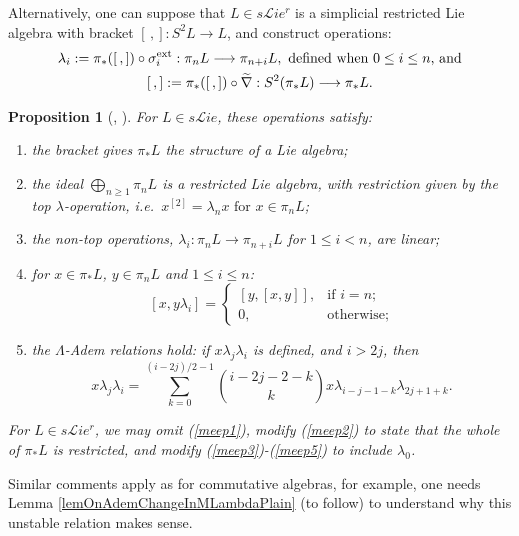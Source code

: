 \documentclass[11pt]{amsart} \renewcommand{\baselinestretch}{1.2}
\theoremstyle{plain}
\newtheorem{prop}[thm]{Proposition}
\numberwithin{equation}{section} %
\theoremstyle{plain}
\newtheorem{prop}[thm]{Proposition}
\numberwithin{equation}{chapter} %
\renewcommand{\to}{\longrightarrow}
\newcommand{\scrL}{\mathscr{L}}
\newcommand{\citeBOX}[2][]{\cite[\mbox{#1}]{#2}}
\newcommand{\restn}[1]{#1^{[2]}}
\newcommand{\liealgs}{{\scrL\!\textit{ie}}}
\newcommand{\restliealgs}{{\scrL\!\textit{ie}^\textit{r}}}
\begin{document}
\begin{Constructing homotopy operations}
Alternatively, one can suppose that $L\in s \restliealgs$ is a simplicial restricted Lie algebra with bracket $[\,,]:S^2L\to L$, and construct operations:
\begin{gather*}
\lambda_i:=\pi_*([\,,])\circ\sigma_i^\textup{ext}:\pi_nL\to \pi_{n+i}L,\textup{ defined when }0\leq i\leq n\textup{, and}\\
[\,,]:=\pi_*([\,,])\circ\widetilde{\nabla}:S^2(\pi_*L)\to \pi_{*}L.
\end{gather*}
\begin{prop}[{\cite{6Author.pdf}, \citeBOX[\S8]{CurtisSimplicialHtpy.pdf}}]
\label{omnibus on htpy of Lie algs}
For $L\in s \liealgs$, these operations satisfy:
\begin{enumerate}
\item \label{meep1} the bracket gives $\pi_*L$ the structure of a Lie algebra;
\item \label{meep2} the ideal $\bigoplus_{n\geq1}\pi_nL$ is a restricted Lie algebra, with restriction given by the \emph{top $\lambda$-operation}, i.e.\ $\restn{x}=\lambda_nx\text{ for }x\in\pi_nL$;
\item \label{meep3} the \emph{non-top} operations, $\lambda_i:\pi_nL\to \pi_{n+i}L$ for $1\leq i<n$, are linear;
\item \label{meep4} for $x\in \pi_*L$, $y\in \pi_nL$ and $1\leq i\leq n$:
\[[x,y\lambda_i]=\begin{cases}
[y,[x,y]],&\text{if }i=n;\\
0,&\text{otherwise};
\end{cases}
\]
\item \label{meep5} the \emph{$\Lambda$-Adem relations} hold: if $x\lambda_j\lambda_i$ is defined, and $i>2j$, then
\[x\lambda_j\lambda_i=\sum_{k=0}^{(i-2j)/2-1}\binom{i-2j-2-k}{ k}x\lambda_{i-j-1-k}\lambda_{2j+1+k}.\]
\end{enumerate}
For $L\in s \restliealgs$, we may omit (\ref{meep1}), modify (\ref{meep2}) to state that the whole of $\pi_*L$ is restricted, and modify (\ref{meep3})-(\ref{meep5}) to include $\lambda_0$.
\end{prop}
Similar comments apply as for commutative algebras, for example, one needs Lemma \ref{lemOnAdemChangeInMLambdaPlain} (to follow) to understand why this unstable relation makes sense. 


\end{Constructing homotopy operations}
\end{document}
